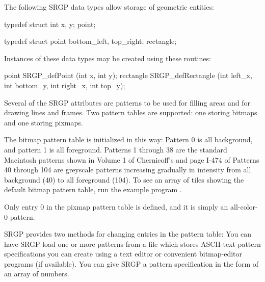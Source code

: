 




The following SRGP data types allow storage of geometric entities:

\begincode
typedef struct \lb
      int x, y;
\rb point;

typedef struct \lb
      point bottom_left, top_right;
\rb rectangle;
\endcode

\newpar
Instances of these data types may be created using these routines:

\newsynopsis
point SRGP_defPoint (int x, int y);
rectangle SRGP_defRectangle (int left_x, int bottom_y, int right_x, int top_y);
\endsynopsis

                                                  





Several of the SRGP attributes are patterns to be used for filling areas and
for drawing lines and frames.  Two pattern tables are supported: one storing
bitmaps and one storing pixmaps. 

\newpar
The bitmap pattern table is initialized in this way: Pattern 0 is all
background, and pattern 1 is all foreground.  Patterns 1 through 38 are the
standard Macintosh patterns shown in Volume 1 of Chernicoff's  and page I-474 of   
Patterns 40 through 104 are greyscale patterns increasing gradually
in intensity from all background (40) to all foreground (104).  
 To see an array of tiles showing the default bitmap pattern table,
run the example program
.

\newpar
Only entry 0 in the pixmap pattern table is defined, and it is simply an
all-color-0 pattern.

\newpar
SRGP provides two methods for changing entries in the pattern table:
\bullitem You can have SRGP load one or more patterns from a file which stores
ASCII-text pattern specifications you can create using a text editor or
convenient bitmap-editor programs (if available).
\bullitem You can give SRGP a pattern specification in the form of an array of
numbers.

